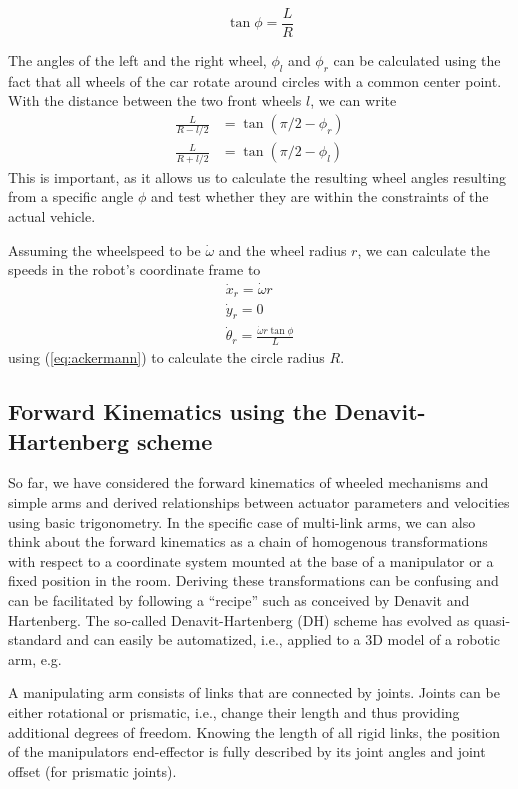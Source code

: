 \begin{equation}\label{eq:ackermann}
\tan \phi = \frac{L}{R}
\end{equation}

The angles of the left and the right wheel, $ \phi_l$ and $ \phi_r$ can be calculated using the fact that all wheels of the car rotate around circles with a common center point. With the distance between the two front wheels $l$, we can write
\begin{eqnarray}
\frac{L}{R-l/2}&=\tan{(\pi/2-\phi_r)}\\
\frac{L}{R+l/2}&=\tan{(\pi/2-\phi_l)}
\end{eqnarray}
This is important, as it allows us to calculate the resulting wheel angles resulting from a specific angle $\phi$ and test whether they are within the constraints of the actual vehicle.

Assuming the wheelspeed to be $\dot{\omega}$ and the wheel radius $r$, we can calculate the speeds in the robot's coordinate frame to
\begin{eqnarray}
\dot{x}_r=\dot{\omega}r\\
\dot{y}_r=0\\
\dot{\theta}_r=\frac{\dot{\omega}r\tan\phi}{L}
\end{eqnarray}
using (\ref{eq:ackermann}) to calculate the circle radius $R$.

\subsection{Forward Kinematics using the Denavit-Hartenberg scheme}
So far, we have considered the forward kinematics of wheeled mechanisms and simple arms and derived relationships between actuator parameters and velocities using basic trigonometry. In the specific case of multi-link arms, we can also think about the forward kinematics as a chain of homogenous transformations with respect to a coordinate system mounted at the base of a manipulator or a fixed position in the room. Deriving these transformations can be confusing and can be facilitated by following a ``recipe'' such as conceived by Denavit and Hartenberg. The so-called Denavit-Hartenberg (DH) scheme has evolved as quasi-standard and can easily be automatized, i.e., applied to a 3D model of a robotic arm, e.g.

A manipulating arm consists of links that are connected by joints. Joints can be either rotational or prismatic, i.e., change their length and thus providing additional degrees of freedom. Knowing the length of all rigid links, the position of the manipulators end-effector is fully described by its joint angles and joint offset (for prismatic joints).

